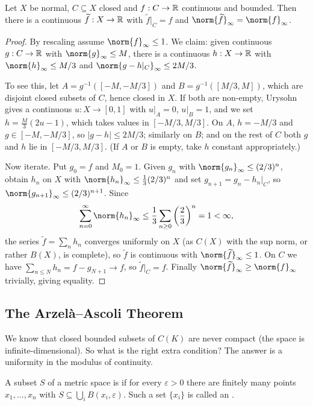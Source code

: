 \documentclass[a4paper]{scrartcl}
\newcommand{\wt}{\widetilde}
\begin{document}
\begin{theorem}
	Let $X$ be normal, $C \subseteq X$ closed and $f : C \to \mathbb{R}$ continuous and bounded. Then there is a continuous $\wt f : X \to \R$ with $\wt f|_C = f$ and $\norm{\wt f}_\infty = \norm{f}_\infty$.
\end{theorem}

\begin{proof}
	By rescaling assume $\norm{f}_\infty \leq 1$. We claim: given continuous $g : C \to \mathbb{R}$ with $\norm{g}_\infty \leq M$, there is a continuous $h : X \to \mathbb{R}$ with $\norm{h}_\infty \leq M/3$ and $\norm{g - h|_C}_\infty \leq 2M/3$.

	To see this, let $A = g^{-1}([-M,-M/3])$ and $B = g^{-1}([M/3, M])$, which are disjoint closed subsets of $C$, hence closed in $X$. If both are non-empty, Urysohn gives a continuous $u : X \to [0,1]$ with $u|_A = 0$, $u|_B = 1$, and we set $h = \frac{M}{3}(2u - 1)$, which takes values in $[-M/3, M/3]$. On $A$, $h = -M/3$ and $g \in [-M,-M/3]$, so $|g - h| \leq 2M/3$; similarly on $B$; and on the rest of $C$ both $g$ and $h$ lie in $[-M/3,M/3]$. (If $A$ or $B$ is empty, take $h$ constant appropriately.)

	Now iterate. Put $g_0 = f$ and $M_0 = 1$. Given $g_n$ with $\norm{g_n}_\infty \leq (2/3)^n$, obtain $h_n$ on $X$ with $\norm{h_n}_\infty \leq \frac13 (2/3)^n$ and set $g_{n+1} = g_n - h_n|_C$, so $\norm{g_{n+1}}_\infty \leq (2/3)^{n+1}$. Since
	$$\sum_{n=0}^\infty \norm{h_n}_\infty \leq \frac{1}{3}\sum_{n \geq 0}\left(\frac23\right)^n = 1 < \infty,$$
	the series $\wt f = \sum_n h_n$ converges uniformly on $X$ (as $C(X)$ with the sup norm, or rather $B(X)$, is complete), so $\wt f$ is continuous with $\norm{\wt f}_\infty \leq 1$. On $C$ we have $\sum_{n \leq N} h_n = f - g_{N+1} \to f$, so $\wt f|_C = f$. Finally $\norm{\wt f}_\infty \geq \norm{f}_\infty$ trivially, giving equality.
\end{proof}

\subsection{The Arzelà--Ascoli Theorem}

We know that closed bounded subsets of $C(K)$ are never compact (the space is infinite-dimensional). So what is the right extra condition? The answer is a uniformity in the modulus of continuity.

\begin{definition}
	A subset $S$ of a metric space is  if for every $\varepsilon > 0$ there are finitely many points $x_1, \dots, x_n$ with $S \subseteq \bigcup_i B(x_i,\varepsilon)$. Such a set $\{x_i\}$ is called an .
\end{definition}
\end{document}
